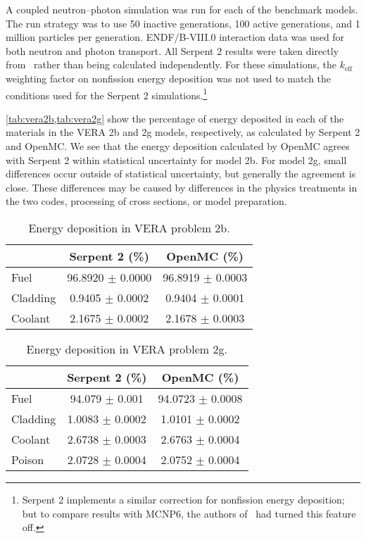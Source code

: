 \documentclass{anstrans}
\begin{document}
A coupled neutron--photon simulation was run for each of the benchmark models.
The run strategy was to use 50 inactive generations, 100 active generations, and
1 million particles per generation. ENDF/B-VIII.0 interaction data was used for
both neutron and photon transport. All Serpent 2 results were taken directly
from~\cite{tuominen2019ane} rather than being calculated independently. For
these simulations, the $k_\text{eff}$ weighting factor on nonfission energy
deposition was not used to match the conditions used for the Serpent 2
simulations.\!\footnote{Serpent 2 implements a similar correction for
nonfission energy deposition; but to compare results with MCNP6, the authors
of~\cite{tuominen2019ane} had turned this feature off.}

\cref{tab:vera2b,tab:vera2g} show the percentage of energy deposited in each of
the materials in the VERA 2b and 2g models, respectively, as calculated by
Serpent 2 and OpenMC. We see that the energy deposition calculated by OpenMC
agrees with Serpent 2 within statistical uncertainty for model 2b. For model 2g,
small differences occur  outside of statistical uncertainty, but generally
the agreement is close. These differences may be caused by differences in
the physics treatments in the two codes, processing of cross sections, or model
preparation.
\begin{table}[htbp]
  \centering
  \caption{Energy deposition in VERA problem 2b.}
  \label{tab:vera2b}
  \begin{tabular}{lcc}
    \toprule
    & Serpent 2 (\%) & OpenMC (\%) \\
    \midrule
    Fuel & 96.8920 $\pm$ 0.0000 & 96.8919 $\pm$ 0.0003 \\
    Cladding & 0.9405 $\pm$ 0.0002 & 0.9404 $\pm$ 0.0001 \\
    Coolant & 2.1675 $\pm$ 0.0002 & 2.1678 $\pm$ 0.0003 \\
    \bottomrule
  \end{tabular}
\end{table}

\begin{table}[htbp]
  \centering
  \caption{Energy deposition in VERA problem 2g.}
  \label{tab:vera2g}
  \begin{tabular}{lcc}
    \toprule
    & Serpent 2 (\%) & OpenMC (\%) \\
    \midrule
    Fuel & 94.079 $\pm$ 0.001 & 94.0723 $\pm$ 0.0008 \\
    Cladding & 1.0083 $\pm$ 0.0002 & 1.0101 $\pm$ 0.0002 \\
    Coolant & 2.6738 $\pm$ 0.0003 & 2.6763 $\pm$ 0.0004 \\
    Poison & 2.0728 $\pm$ 0.0004 & 2.0752 $\pm$ 0.0004 \\
    \bottomrule
  \end{tabular}
\end{table}
\end{document}
